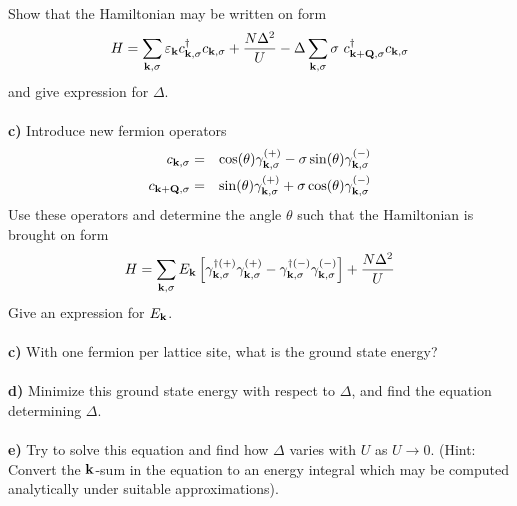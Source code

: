 \begin{problem}
\ \\
Show that the Hamiltonian may be written on form
\begin{eqnarray}
	H = \sum_{{\bf k},\sigma}  {\varepsilon_{{\bf k}}}  c^{\dagger}_{{\bf k},\sigma} c_{{\bf k},\sigma} + \frac{N \Delta^2}{U} 
	- \Delta \sum_{{\bf k},\sigma} \sigma  ~ c^{\dagger}_{{\bf k}+{\bf Q},\sigma} c_{{\bf k},\sigma}  \nonumber
\end{eqnarray} 
and give expression for $\Delta$.
\ \\
\ \\
{\bf c)} Introduce new fermion operators
\begin{eqnarray}
	c_{{\bf k},\sigma} & = & \cos(\theta) \gamma^{(+)}_{{\bf k},\sigma} - \sigma \sin(\theta) \gamma^{(-)}_{{\bf k},\sigma} \nonumber \\
	c_{{\bf k}+{\bf Q},\sigma} & = & \sin(\theta) \gamma^{(+)}_{{\bf k},\sigma} + \sigma \cos(\theta) \gamma^{(-)}_{{\bf k},\sigma} \nonumber 
\end{eqnarray}
Use these operators and determine the angle $\theta$ such that the Hamiltonian is brought on form
\begin{eqnarray}
	H = \sum_{{\bf k}, \sigma} E_{\bf k} \left[ \gamma^{\dagger (+)}_{{\bf k},\sigma}    \gamma^{(+)}_{{\bf k},\sigma}  
	-  \gamma^{\dagger (-)}_{{\bf k},\sigma}    \gamma^{(-)}_{{\bf k},\sigma}  \right] + \frac{N \Delta^2}{U} \nonumber
\end{eqnarray} 
Give an expression for $E_{\bf k}$.
\ \\
\ \\
{\bf c)} With one fermion per lattice site, what is the ground state energy? 
\ \\
\ \\
{\bf d)} Minimize this ground state energy with respect to $\Delta$, and find the equation determining $\Delta$.
\ \\
\ \\
{\bf e)} Try to solve this equation and find how $\Delta$ varies with $U$ as $U \to 0$. (Hint: Convert the ${\bf k}$-sum in the equation to an energy integral which may be computed analytically under suitable approximations).  
\ \\
\ \\
\end{problem}